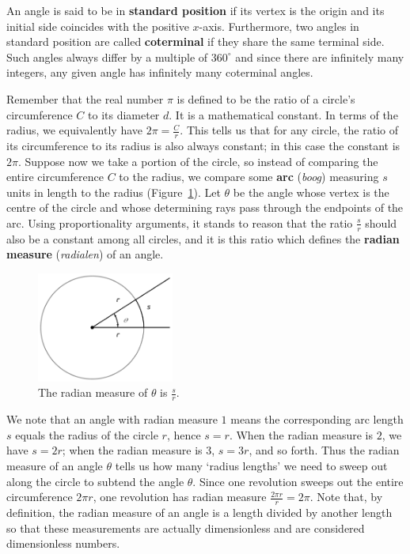 An angle is said to be in \textbf{standard position} if its vertex is the origin and its initial side coincides with the positive $x$-axis. Furthermore, two angles in standard position are called \textbf{coterminal} if they share the same terminal side. Such angles always differ by a multiple of $360^{\circ}$ and since there are infinitely many integers, any given angle has infinitely many coterminal angles.

Remember that the real number $\pi$ is defined to be the ratio of a circle's circumference $C$ to its diameter $d$. It is a mathematical constant. In terms of the radius, we equivalently have $2 \pi = \frac{C}{r}$. This tells us that for any circle, the ratio of its circumference to its radius is also always constant; in this case the constant is $2\pi$.  Suppose now we take a portion of the circle, so instead of comparing the entire circumference $C$ to the radius, we compare some \textbf{arc} (\textit{boog}) measuring $s$ units in length to the radius (Figure~\ref{fig_trans_8}).  Let $\theta$ be the angle whose vertex is the centre of the circle and whose determining rays pass through the endpoints of the arc.  Using proportionality arguments, it stands to reason that the ratio $\frac{s}{r}$ should also be a constant among all circles, and it is this ratio which defines the \textbf{radian measure} (\textit{radialen}) of an angle.   



\begin{figure}
	\begin{center}			\includegraphics[width=0.4\textwidth]{fig_trans_8}
	\caption{The radian measure of $\theta$ is $\frac{s}{r}$. }
	\label{fig_trans_8}
	\end{center}
\end{figure}


We note that an angle with radian measure $1$ means the corresponding arc length $s$ equals the radius of the circle $r$, hence $s = r$.  When the radian measure is $2$, we have $s = 2r$; when the radian measure is $3$, $s = 3r$, and so forth.  Thus the radian measure of an angle $\theta$ tells us how many `radius lengths' we need to sweep out along the circle to subtend the angle $\theta$.  Since one revolution sweeps out the entire circumference $2\pi r$, one revolution has radian measure $\frac{2 \pi r}{r} = 2 \pi$.   Note that, by definition, the radian measure of an angle is a length divided by another length so that these measurements are actually dimensionless and are considered dimensionless numbers. 


